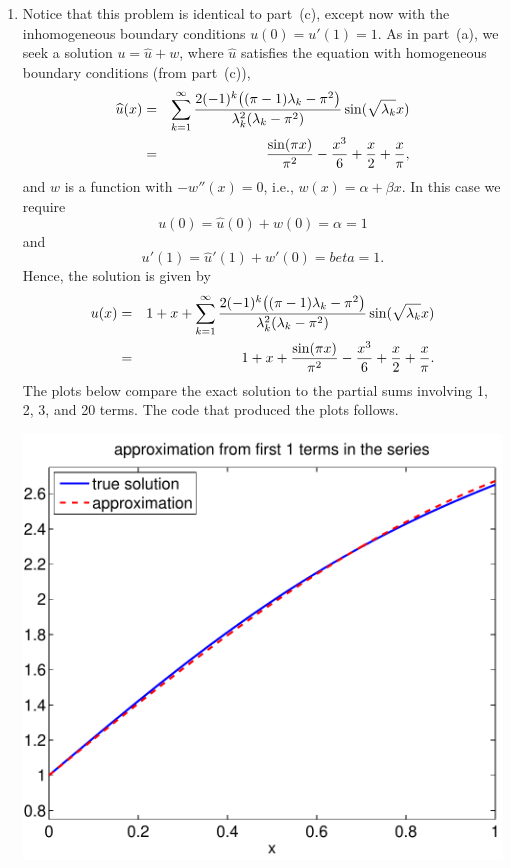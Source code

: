 {\begin{solution}
\begin{enumerate}
\item Notice that this problem is identical to part~(c), except
now with the inhomogeneous boundary conditions $u(0) = u'(1) = 1$.
As in part~(a), we seek a solution $u = \widehat{u} + w$, where
$\widehat{u}$ satisfies the equation with homogeneous boundary conditions
(from part~(c)),
\begin{eqnarray*}
    \widehat{u}(x)
          &=& \sum_{k=1}^\infty 
                   {2 (-1)^k \big((\pi-1)\lambda_k - \pi^2\big)
                     \over \lambda_k^2(\lambda_k-\pi^2)}
                              \sin(\sqrt{\lambda_k} x) \\
          &=& {\sin(\pi x) \over \pi^2} -{x^3 \over 6} + {x\over 2} + {x\over \pi},
\end{eqnarray*}
and $w$ is a function with $-w''(x) = 0$, i.e., $w(x) = \alpha + \beta x$.
In this case we require 
\[ u(0) = \widehat{u}(0) + w(0) = \alpha = 1\]
and 
\[ u'(1) = \widehat{u}'(1) + w'(0) = beta = 1.\]
Hence, the solution is given by
\begin{eqnarray*}
   u(x) &=& 1 + x + 
             \sum_{k=1}^\infty 
                   {2 (-1)^k \big((\pi-1)\lambda_k - \pi^2\big)
                     \over \lambda_k^2(\lambda_k-\pi^2)}
                              \sin(\sqrt{\lambda_k} x) \\
        &=& 1 + x + {\sin(\pi x) \over \pi^2} -{x^3 \over 6} + {x\over 2} + {x\over \pi}.
\end{eqnarray*}
The plots below compare the exact solution to the partial sums involving
1, 2, 3, and 20 terms.  The code that produced the plots follows.
\begin{center}
   \includegraphics[scale=0.4]{bvps2b_1}\quad

\end{center}
\end{enumerate}
\end{solution}}
